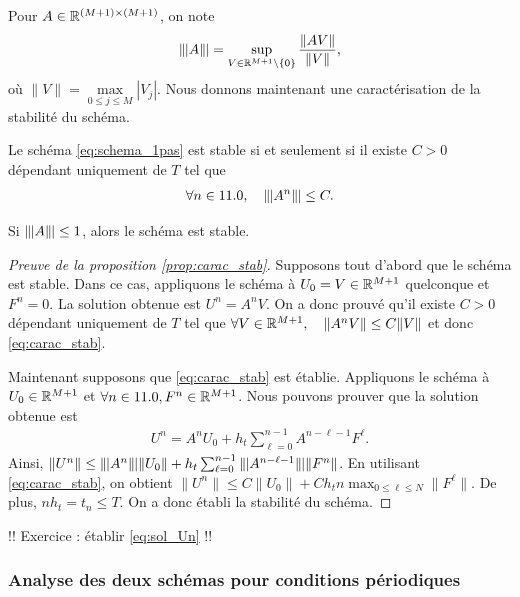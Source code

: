 \documentclass[12pt,a4paper,twoside]{article}
\begin{document}
Pour $A \in \mathbb{R}^{(M+1)\times (M+1)}$, on note 
\[
  \|\!\;\!| A \|\!\;\!| = \sup_{V \in \mathbb{R}^{M+1} \backslash\{0\}} \dfrac{\| A V \|}{\| V \|} ,
\]
o\`u $\| V \| = \max\limits_{0\leq j \leq M} | V_j |$.
Nous donnons maintenant une caract\'erisation de la stabilit\'e du sch\'ema.
\begin{proposition}
  \label{prop:carac_stab}
  Le sch\'ema \eqref{eq:schema_1pas} est stable si et seulement si
  il existe $C>0$ d\'ependant uniquement de $T$ tel que
  \begin{align}
    \label{eq:carac_stab}
    \forall n \in 11.0 , \quad \|\!\;\!| A^n \|\!\;\!| \leq C .
  \end{align}
\end{proposition}

\begin{corrolary}
  \label{corro:stability}
  Si $\|\!\;\!| A \|\!\;\!| \leq 1$, alors le sch\'ema est stable.
\end{corrolary}

\begin{proof}[Preuve de la proposition \ref{prop:carac_stab}]
  Supposons tout d'abord que le sch\'ema est stable.
  Dans ce cas, appliquons le sch\'ema \`a $U_0 = V \in \mathbb{R}^{M+1}$
  quelconque et $F^n = 0$. 
  La solution obtenue est $U^n = A^n V$.
  On a donc prouv\'e qu'il existe $C>0$ d\'ependant uniquement
  de $T$ tel que
  $\forall V \in \mathbb{R}^{M+1} , \quad \| A^n V \| \leq C \| V \|$
  et donc \eqref{eq:carac_stab}.

  Maintenant supposons que \eqref{eq:carac_stab} est \'etablie.
  Appliquons le sch\'ema \`a $U_0 \in \mathbb{R}^{M+1}$
  et $\forall n \in 11.0 , F^n \in \mathbb{R}^{M+1}$.
  Nous pouvons prouver que la solution obtenue est
  \begin{align}
    \label{eq:sol_Un}
    U^n = A^n U_0 + h_t \sum_{\ell = 0}^{n-1} A^{n-\ell-1} F^{\ell} .
  \end{align}
  Ainsi, $\| U^n \| \leq \tn A^n \tn \| U_0 \| 
  + h_t \sum_{\ell = 0}^{n-1} \tn A^{n-\ell-1} \tn \| F^n \|$.
  En utilisant \eqref{eq:carac_stab}, on obtient
  $\| U^n \| \leq C \| U_0 \| + C h_t n \max_{0\leq \ell \leq N} \| F^{\ell} \|$.
  De plus, $n h_t = t_n \leq T$.
  On a donc \'etabli la stabilit\'e du sch\'ema.
\end{proof}


!! Exercice : \'etablir \eqref{eq:sol_Un} !!

\subsubsection{Analyse des deux sch\'emas pour conditions p\'eriodiques}
\end{document}
